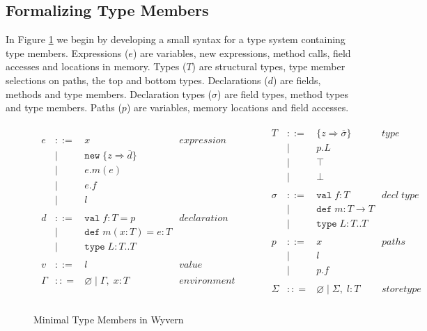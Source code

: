 \documentclass[a4paper,UKenglish]{lipics}
\begin{document}
\subsection{Formalizing Type Members}
In Figure \ref{f:min_syntax} we begin by developing a small syntax for a type system containing type members. Expressions ($e$) are variables, new expressions, method calls, field accesses and locations in memory. Types ($T$) are structural types, type member selections on paths, the top and bottom types. Declarations ($d$) are fields, methods and type members. Declaration types ($\sigma$) are field types, method types and type members. Paths ($p$) are variables, memory locations and field accesses.
\begin{figure}[h]
\[
\begin{array}{lll}
\begin{array}{lllr}
e & ::= & x & expression \\
& | & \texttt{new} \; \{z \Rightarrow \overline{d}\}&\\
& | & e.m(e) &\\
& | & e.f &\\
& | & l &\\
&&\\
d & ::= & \texttt{val} \; f : T = p & declaration \\
  & |   & \texttt{def} \; m(x:T) = e : T &\\
  & |   & \texttt{type} \; L : T .. T&\\
&&\\
v & ::= & l & value \\
&&\\
\Gamma & :: = & \varnothing \; | \; \Gamma,\; x : T & environment \\
 \end{array}
& ~~~~~~
&
\begin{array}{lllr}
T & ::= & \{z \Rightarrow \overline{\sigma}\} & type \\
& | & p.L &\\
& | & \top & \\
& | & \bot & \\
&&\\
\sigma & ::= & \texttt{val} \; f:T & decl \; type\\
       & |   & \texttt{def} \; m:T \rightarrow T \\
		 & |   & \texttt{type} \; L : T .. T &\\
&&\\
p & ::= & x & paths \\
& | & l &\\
& | & p.f &\\
&&\\
\Sigma & :: = & \varnothing \; | \; \Sigma,\; l : T & store type \\
\end{array}
\end{array}
\]
\caption{Minimal Type Members in Wyvern}
\label{f:min_syntax}
\end{figure}
\end{document}
